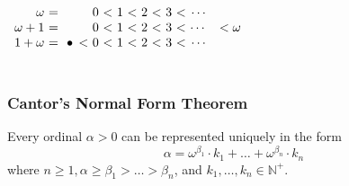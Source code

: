 \documentclass[UTF8,aspectratio=43,11pt,colorlinks,compress,openany]{beamer}%
\begin{document}
\begin{frame}
\begin{columns}
{\begin{minipage}{\textwidth}
					\[\begin{array}{r@{\ =\ \ }cc@{\ <\ }c@{\ <\ }c@{\ <\ }c@{\ <\ }cc}
					\omega & & 0 & 1 & 2 & 3 & \cdots\\
					\omega+1 & & 0 & 1 & 2 & 3 & \cdots & 
					< \omega\\
					1+\omega & \bullet\,<\!\!\!\!& 0 & 1 & 2 & 3 & \cdots
					\end{array}\]
			\end{minipage}}
	\end{columns}
\end{frame}

\begin{frame}\frametitle{Cantor's Normal Form Theorem}
	\begin{theorem}
		Every ordinal $\alpha>0$ can be represented uniquely in the form
		\[\alpha=\omega^{\beta_1}\cdot k_1+\dots+\omega^{\beta_n}\cdot k_n\]
		where $n\geq 1, \alpha\geq\beta_1>\dots>\beta_n$, and $k_1,\dots,k_n\in\mathbb{N}^+$.
	\end{theorem}
\end{frame}
\end{document}

